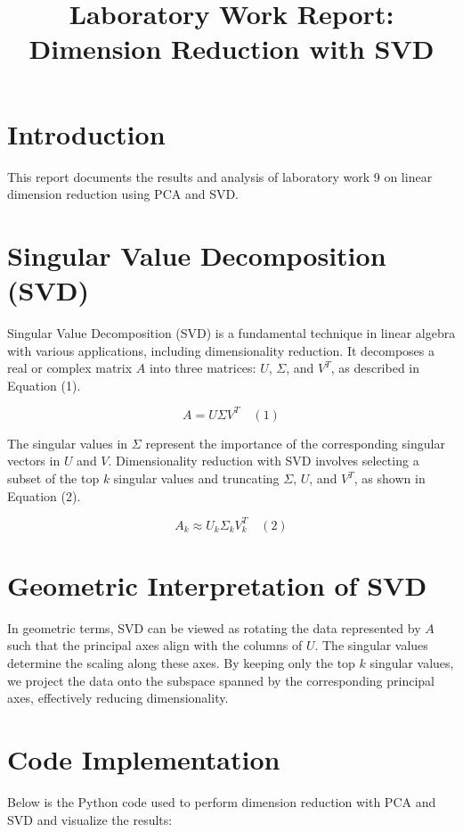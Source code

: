 \documentclass{article}
\title{Laboratory Work Report: Dimension Reduction with SVD}
\begin{document}
\maketitle

\section{Introduction}

This report documents the results and analysis of laboratory work 9 on linear dimension reduction using PCA and SVD.

\section{Singular Value Decomposition (SVD)}
Singular Value Decomposition (SVD) is a fundamental technique in linear algebra with various applications, including dimensionality reduction. It decomposes a real or complex matrix \( A \) into three matrices: \( U \), \( \Sigma \), and \( V^T \), as described in Equation (1).

\[ A = U \Sigma V^T \quad (1) \]

The singular values in \( \Sigma \) represent the importance of the corresponding singular vectors in \( U \) and \( V \). Dimensionality reduction with SVD involves selecting a subset of the top \( k \) singular values and truncating \( \Sigma \), \( U \), and \( V^T \), as shown in Equation (2).

\[ A_k \approx U_k \Sigma_k V_k^T \quad (2) \]

\section{Geometric Interpretation of SVD}
In geometric terms, SVD can be viewed as rotating the data represented by \( A \) such that the principal axes align with the columns of \( U \). The singular values determine the scaling along these axes. By keeping only the top \( k \) singular values, we project the data onto the subspace spanned by the corresponding principal axes, effectively reducing dimensionality.

\section{Code Implementation}
Below is the Python code used to perform dimension reduction with PCA and SVD and visualize the results:
\end{document}
